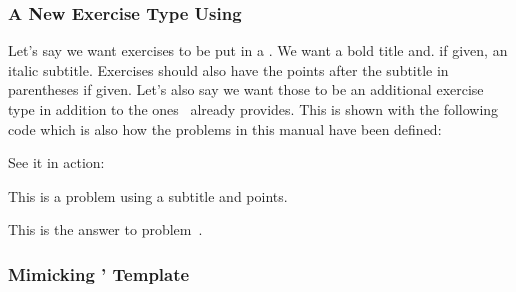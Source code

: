 \documentclass{xsim-manual}
\begin{document}
\subsubsection{A New Exercise Type Using }
Let's say we want exercises to be put in a . We want a bold
title and. if given, an italic subtitle.  Exercises should also have the
points after the subtitle in parentheses if given.  Let's also say we want
those to be an additional exercise type in addition to the ones \xsim\ already
provides.  This is shown with the following code which is also how the
problems in this manual have been defined:

\begin{sourcecode}
    {%
      \tcolorbox[
        colback = red!5!white ,
        colframe = red!75!black ,
        colbacktitle = yellow!50!red ,
        coltitle = red!25!black ,
        breakable ,
        drop shadow ,
        beforeafter skip = .5\baselineskip ,
        title =
          \textbf{\GetExerciseName~\GetExerciseProperty{counter}}%
          \GetExercisePropertyT{subtitle}{ \textit{\PropertyValue}}%
          \IfInsideSolutionF{%
            \GetExercisePropertyT{points}{ %
              (%
                \PropertyValue
                \IfExerciseGoalSingularTF{points}
                  {\XSIMtranslate{point}}
                  {\XSIMtranslate{points}}%
              )%
            }%
          }%
      ]%
    }
    {\endtcolorbox}

\end{sourcecode}

See it in action:
\begin{example}
  \begin{problem}[subtitle=My subtitle,points=5]
    This is a problem using a subtitle and points.
  \end{problem}
  \begin{answer}
    This is the answer to problem~.
  \end{answer}
\end{example}

\subsubsection{Mimicking '  Template}
\end{document}
